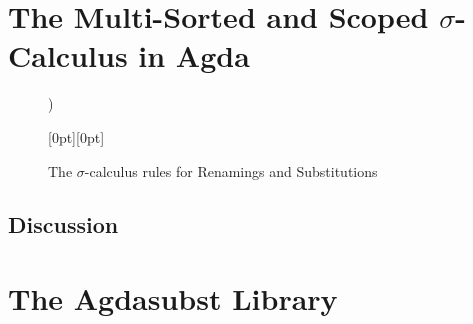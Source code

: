 \documentclass[screen,nonacm]{acmart}
\begin{document}
\section{The Multi-Sorted and Scoped $\sigma$-Calculus in Agda}\label{sec:mis}
\begin{figure}[h]
      \centering

      \begin{minipage}[t]{0.48\linewidth}
            \raggedright{}
            \EDefLaws{}
      \end{minipage}
      \hfill
      \begin{minipage}[t]{0.48\linewidth})
            \raggedright{}
            \EMonadLaws{}
      \end{minipage}

      \vspace{1em}
      \begin{minipage}[t]{0.48\linewidth}
            \raggedright{}
            \ERewriteSys{}
      \end{minipage}
      \hfill
      \raisebox{7.5em}[0pt][0pt]{%
            \begin{minipage}[t]{0.48\linewidth}
                  \raggedright{}
                  \EInteractLaws{}
            \end{minipage}
      }
      \caption{The $\sigma$-calculus rules for Renamings and Substitutions}
      \label{fig:six-frame-layout}
\end{figure}

\subsection{}

\subsection{Discussion}\label{sec:rsn-dis}

\section{The Agdasubst Library}\label{sec:ags}
\end{document}
